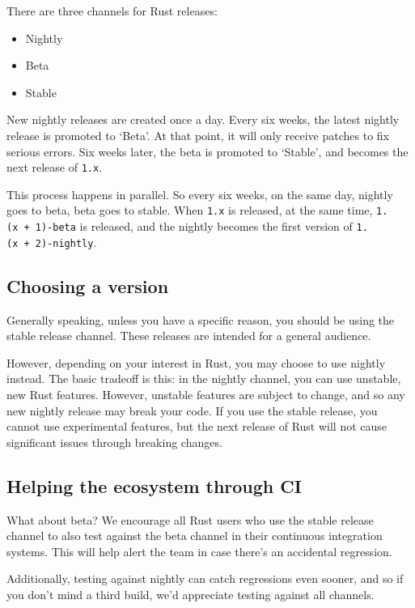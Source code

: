 \documentclass[a4paper,]{book}
\providecommand{\tightlist}{%
  \setlength{\itemsep}{0pt}\setlength{\parskip}{0pt}}
\begin{document}
There are three channels for Rust releases:

\begin{itemize}
\tightlist
\item
  Nightly
\item
  Beta
\item
  Stable
\end{itemize}

New nightly releases are created once a day. Every six weeks, the latest
nightly release is promoted to `Beta'. At that point, it will only
receive patches to fix serious errors. Six weeks later, the beta is
promoted to `Stable', and becomes the next release of \texttt{1.x}.

This process happens in parallel. So every six weeks, on the same day,
nightly goes to beta, beta goes to stable. When \texttt{1.x} is
released, at the same time, \texttt{1.(x\ +\ 1)-beta} is released, and
the nightly becomes the first version of \texttt{1.(x\ +\ 2)-nightly}.

\subsection{Choosing a version}\label{choosing-a-version}

Generally speaking, unless you have a specific reason, you should be
using the stable release channel. These releases are intended for a
general audience.

However, depending on your interest in Rust, you may choose to use
nightly instead. The basic tradeoff is this: in the nightly channel, you
can use unstable, new Rust features. However, unstable features are
subject to change, and so any new nightly release may break your code.
If you use the stable release, you cannot use experimental features, but
the next release of Rust will not cause significant issues through
breaking changes.

\subsection{Helping the ecosystem through
CI}\label{helping-the-ecosystem-through-ci}

What about beta? We encourage all Rust users who use the stable release
channel to also test against the beta channel in their continuous
integration systems. This will help alert the team in case there's an
accidental regression.

Additionally, testing against nightly can catch regressions even sooner,
and so if you don't mind a third build, we'd appreciate testing against
all channels.
\end{document}
